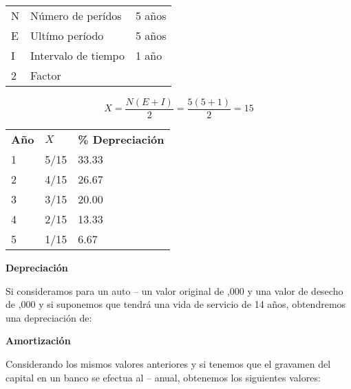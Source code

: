 \begin{enumerate}[label=\alph*)]
    \begin{table}[h]
        \centering
        \begin{tabular}{p{1cm} p{4cm} p{2cm}}
            N & Número de perídos & 5 años \\
            E & Ultímo período & 5 años \\
            I & Intervalo de tiempo & 1 año \\
            2 & Factor &
        \end{tabular}
    \end{table}
    
    \[X=\frac{N(E+I)}{2}=\frac{5(5+1)}{2}=15\]
    \begin{table}[h]
        \centering
        \begin{tabular}{p{1cm} p{1cm} p{4cm}}
            \textbf{Año} & \textbf{$X$} & \textbf{\% Depreciación} \\
            1 & 5/15 & 33.33 \\
            2 & 4/15 & 26.67 \\
            3 & 3/15 & 20.00 \\
            4 & 2/15 & 13.33 \\
            5 & 1/15 & 6.67
        \end{tabular}
    \end{table}
\end{enumerate}
\begin{example}
    \textbf{Depreciación}

    Si consideramos para un auto -- un valor original de ,000 y una valor de desecho de ,000
    y si suponemos que tendrá una vida de servicio de 14 años, obtendremos una depreciación de:
\end{example}
\begin{example}
    \textbf{Amortización}

    Considerando los mismos valores anteriores y si tenemos que el gravamen del capital en un banco se efectua al --
    anual, obtenemos los siguientes valores:
\end{example}
